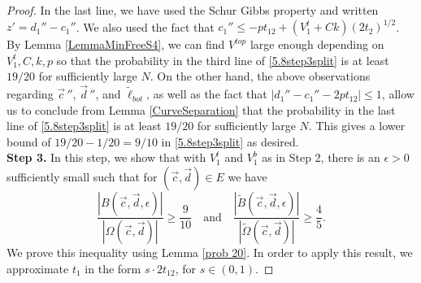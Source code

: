 \begin{proof}
	In the last line, we have used the Schur Gibbs property and written $z' = d_1'' - c_1''$. We also used the fact that $c_1'' \leq -pt_{12} + (V_1^t + Ck)(2t_2)^{1/2}$. By Lemma \ref{LemmaMinFreeS4}, we can find $V^{top}$ large enough depending on $V_1^t,C,k,p$ so that the probability in the third line of \eqref{5.8step3split} is at least $19/20$ for sufficiently large $N$. On the other hand, the above observations regarding $\vec{c}\,''$, $\vec{d}\,''$, and $\tilde{\ell}_{bot}$, as well as the fact that $|d_1'' - c_1'' - 2pt_{12}| \leq 1$, allow us to conclude from Lemma \ref{CurveSeparation} that the probability in the last line of \eqref{5.8step3split} is at least $19/20$ for sufficiently large $N$. This gives a lower bound of $19/20 - 1/20 = 9/10$ in \eqref{5.8step3split} as desired.\\
	
	{\bf \raggedleft Step 3.} In this step, we show that with $V_1^t$ and $V_1^b$ as in Step 2, there is an $\epsilon > 0$ sufficiently small such that for $(\vec{c}, \vec{d}) \in E$ we have
	\begin{equation}\label{LemmaBP2Step3}
	\frac{|B(\vec{c}, \vec{d}, \epsilon)|}{|\Omega(\vec{c}, \vec{d})|} \geq  \frac{9}{10} \quad \mathrm{and} \quad \frac{|\tilde{B}(\vec{c}, \vec{d}, \epsilon)|}{|\tilde{\Omega}(\vec{c}, \vec{d})|} \geq  \frac{4}{5}.
	\end{equation}
	We prove this inequality using Lemma \ref{prob 20}. In order to apply this result, we approximate $t_1$ in the form $s\cdot 2t_{12}$, for $s\in(0,1)$.
	

\end{proof}

